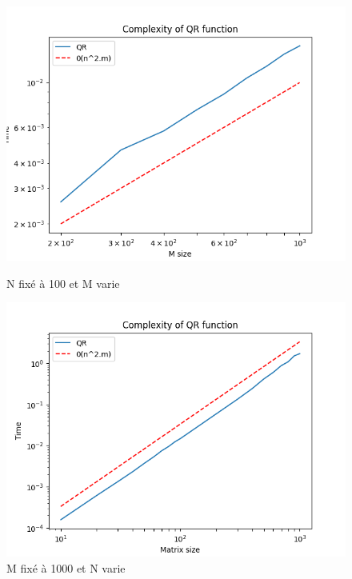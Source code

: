 \documentclass[11pt]{article}
\begin{document}
\begin{figure}[h]
  \begin{minipage}[t]{0.5\textwidth}
    \centering
    \includegraphics[width=\textwidth]{QR_N100.png}
    \caption{N fixé à 100 et M varie}
    \label{fig:image1}
  \end{minipage}
  \hfill
  \begin{minipage}[t]{0.5\textwidth}
    \centering
    \includegraphics[width=\textwidth]{QR_M1000.png}
    \caption{M fixé à 1000 et N varie}
    \label{fig:image2}
  \end{minipage}
\end{figure}
\end{document}

